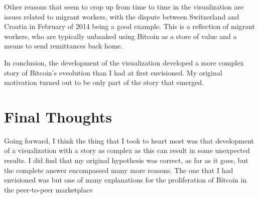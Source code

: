 \documentclass[journal]{vgtc}                %
\begin{document}
Other reasons that seem to crop up from time to time in the visualization are issues related to migrant workers, with the dispute between Switzerland and Croatia\cite{rt-1} in February of 2014 being a good example.  This is a reflection of migrant workers, who are typically unbanked\cite{gulftimes-1} using Bitcoin as a store of value and a means to send remittances back home.

In conclusion, the development of the visualization developed a more complex story of Bitcoin's eveolution than I had at first envisioned.  My original motivation turned out to be only part of the story that emerged.

\section*{Final Thoughts}

Going forward, I think the thing that I took to heart most was that development of a visualization with a story as complex as this can result in some unexpected results.  I did find that my original hypothesis was correct, as far as it goes, but the complete answer encompassed many more reasons.  The one that I had envisioned was but one of many explanations for the proliferation of Bitcoin in the peer-to-peer marketplace 



\end{document}
